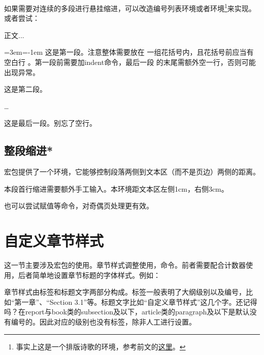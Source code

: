 如果需要对连续的多段进行悬挂缩进，可以改造编号列表环境或者环境\footnote{事实上这是一个排版诗歌的环境，参考前文的\hyperref[envi:verse]{这里}。}来实现。或者尝试：

\begin{codeshow}
正文...

{\leftskip=3em\parindent=-1em
\indent 这是第一段。注意整体需要放在
一组花括号内，且花括号前应当有空白行
。第一段前需要加indent命令，最后一段
的末尾需额外空一行，否则可能出现异常。

这是第二段。

\ldots

这是最后一段。别忘了空行。

}
\end{codeshow}

\subsection{整段缩进*}
宏包提供了一个环境，它能够控制段落两侧到文本区（而不是页边）两侧的距离。
\begin{latex}
\begin{adjustwidth}{1cm}{3cm}
本段首行缩进需要额外手工输入。本环境距文本区左侧1cm，右侧3cm。
\end{adjustwidth}
\end{latex}

也可以尝试赋值等命令，对奇偶页处理更有效。

\section{自定义章节样式}
\label{sec:titlesec}
这一节主要涉及宏包的使用。章节样式调整使用，命令。前者需要配合计数器使用，后者简单地设置章节标题的字体样式。例如：

章节样式由标签和标题文字两部分构成。标签一般表明了大纲级别以及编号，比如“第一章”、“Section 3.1”等。标题文字比如“自定义章节样式”这几个字。还记得吗？在report与book类的subsection及以下，article类的paragraph及以下是默认没有编号的。因此对应的级别也没有标签，除非人工进行设置。

